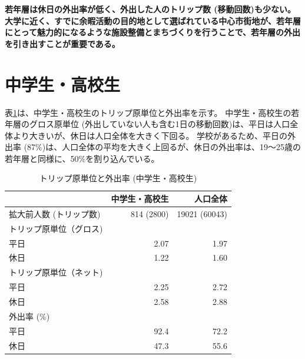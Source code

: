 \documentclass[a4paper,12pt, uplatex]{jsbook}
\begin{document}
\color{red}
\begin{framed}
\noindent
\textbf{\large 若年層は休日の外出率が低く、外出した人のトリップ数 (移動回数)も少ない。大学に近く、すでに余暇活動の目的地として選ばれている中心市街地が、若年層にとって魅力的になるような施設整備とまちづくりを行うことで、若年層の外出を引き出すことが重要である。}
\end{framed}
\color{black}




\clearpage
\section{中学生・高校生}

表\ref{tab:トリップ_外出率_中高生}は、中学生・高校生のトリップ原単位と外出率を示す。
中学生・高校生の若年層のグロス原単位 (外出していない人も含む1日の移動回数)は、平日は人口全体より大きいが、休日は人口全体を大きく下回る。
学校があるため、平日の外出率 (87\%)は、人口全体の平均を大きく上回るが、休日の外出率は、19〜25歳の若年層と同様に、50\%を割り込んでいる。
%
\begin{table}[htbp]
\centering
\caption{トリップ原単位と外出率 (中学生・高校生)}
\label{tab:トリップ_外出率_中高生}
\begin{tabular}{lrr}
\toprule
& 中学生・高校生 & 人口全体 \\
\midrule
拡大前人数 (トリップ数) & 814 (2800) & 19021 (60043)\\
トリップ原単位（グロス) & & \\
\hspace{2em} 平日 & 2.07 & 1.97 \\
\hspace{2em} 休日 & 1.22 & 1.60 \\
トリップ原単位（ネット) & & \\
\hspace{2em} 平日 & 2.25 & 2.72 \\
\hspace{2em} 休日 & 2.58 & 2.88\\
外出率 (\%) & &  \\
\hspace{2em} 平日 & 92.4 & 72.2\\
\hspace{2em} 休日 & 47.3 & 55.6\\
\bottomrule
\end{tabular}
\end{table}
\end{document}
